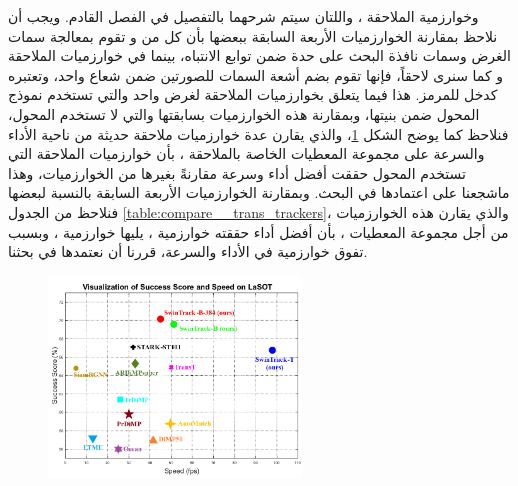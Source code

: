 وخوارزمية الملاحقة 
،
واللتان سيتم شرحهما بالتفصيل في الفصل القادم.
ويجب أن نلاحظ بمقارنة الخوارزميات الأربعة السابقة ببعضها بأن كل من 
و
تقوم بمعالجة سمات الغرض وسمات نافذة البحث على حدة ضمن توابع الانتباه، بينما في خوارزميات الملاحقة 
و
كما سنرى لاحقاً،
فإنها تقوم بضم أشعة السمات للصورتين ضمن شعاع واحد، وتعتبره كدخل للمرمز.
\newline
هذا فيما يتعلق بخوارزميات الملاحقة لغرض واحد والتي تستخدم نموذج المحول ضمن بنيتها، وبمقارنة هذه الخوارزميات بسابقتها والتي لا تستخدم المحول، فنلاحظ كما يوضح الشكل
\ref{fig:comapre}،
والذي يقارن عدة خوارزميات ملاحقة حديثة من ناحية الأداء والسرعة على مجموعة المعطيات الخاصة بالملاحقة 
،
بأن خوارزميات الملاحقة التي تستخدم المحول حققت أفضل أداء وسرعة مقارنةً بغيرها من الخوارزميات، وهذا ماشجعنا على اعتمادها في البحث.
وبمقارنة الخوارزميات الأربعة السابقة بالنسبة لبعضها فنلاحظ من الجدول 
\ref{table:compare__trans_trackers}،
والذي يقارن هذه الخوارزميات من أجل مجموعة المعطيات 
،
بأن أفضل أداء حققته خوارزمية 
، 
يليها خوارزمية 
،
وبسبب تفوق خوارزمية 
في الأداء والسرعة، قررنا أن نعتمدها في بحثنا.
\vspace{-5.0mm}
\begin{figure}[H]
\centerline{\includegraphics[width=0.6\textwidth]{images/transformerInTrackingComapre.png}}
	\caption{}
	\label{fig:comapre}
\end{figure}
\vspace{-7.0mm}
\centerline{}	

